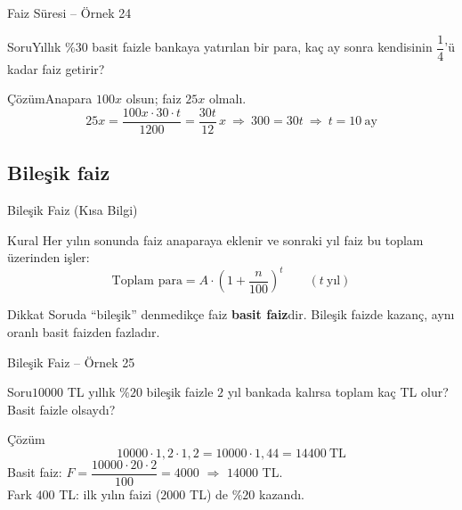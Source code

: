 \documentclass[aspectratio=169,11pt]{beamer}
\newcommand{\soru}[3]{%
\begin{frame}{#1}
  \begin{block}{Soru}\large #2\end{block}
  \pause
  \begin{exampleblock}{Çözüm}\large #3\end{exampleblock}
\end{frame}}
\begin{document}
\soru{Faiz Süresi -- Örnek 24}
{Yıllık \(\%30\) basit faizle bankaya yatırılan bir para, kaç ay sonra kendisinin \(\dfrac{1}{4}\)'ü kadar faiz getirir?}
{Anapara \(100x\) olsun; faiz \(25x\) olmalı.
\[25x=\frac{100x\cdot 30\cdot t}{1200}=\frac{30t}{12}\,x\ \Rightarrow\ 300=30t\ \Rightarrow\ t=10\ \text{ay}\]}

\subsection{Bileşik faiz}
\begin{frame}{Bileşik Faiz (Kısa Bilgi)}
\begin{block}{Kural}
Her yılın sonunda faiz anaparaya eklenir ve sonraki yıl faiz bu toplam üzerinden işler:
\[\text{Toplam para}=A\cdot\left(1+\frac{n}{100}\right)^t\qquad(t\ \text{yıl})\]
\end{block}
\begin{alertblock}{Dikkat}
Soruda ``bileşik'' denmedikçe faiz \textbf{basit faiz}dir. Bileşik faizde kazanç, aynı oranlı basit faizden fazladır.
\end{alertblock}
\end{frame}

\soru{Bileşik Faiz -- Örnek 25}
{\(10000\) TL yıllık \(\%20\) bileşik faizle \(2\) yıl bankada kalırsa toplam kaç TL olur? Basit faizle olsaydı?}
{\[10000\cdot 1{,}2\cdot 1{,}2=10000\cdot 1{,}44=14400\ \text{TL}\]
Basit faiz: \(F=\dfrac{10000\cdot 20\cdot 2}{100}=4000\) \(\Rightarrow\) \(14000\) TL.\\[3pt]
Fark \(400\) TL: ilk yılın faizi (\(2000\) TL) de \(\%20\) kazandı.}
\end{document}
